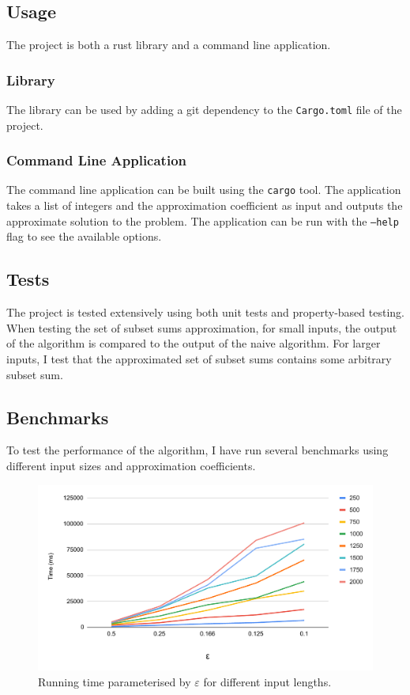 \subsection{Usage}
The project is both a rust library and a command line application. 
\subsubsection{Library}
The library can be used by adding a git dependency to the \texttt{Cargo.toml} file of the project.
\subsubsection{Command Line Application}
The command line application can be built using the \texttt{cargo} tool. The application takes a list of integers and the approximation coefficient as input and outputs the approximate solution to the \Partition problem. The application can be run with the \texttt{--help} flag to see the available options.

\subsection{Tests}
The project is tested extensively using both unit tests and property-based testing. When testing the set of subset sums approximation, for small inputs, the output of the algorithm is compared to the output of the naive algorithm. For larger inputs, I test that the approximated set of subset sums contains some arbitrary subset sum.

\subsection{Benchmarks}
To test the performance of the algorithm, I have run several benchmarks using different input sizes and approximation coefficients. 
\begin{figure}[h!]
    \centering
    \includegraphics[width=0.8\linewidth]{charts/epsilon.pdf}
    \caption{Running time parameterised by $\varepsilon$ for different input lengths.}
    \label{fig:epsilon}
\end{figure}

